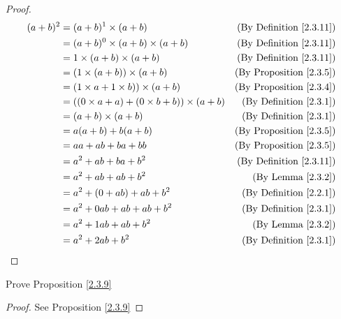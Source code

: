 \begin{proof}
\begin{align*}
    (a + b)^2 &= (a + b)^1 \times (a + b) & \text{(By Definition \ref{2.3.11})} \\
    &= (a + b)^0 \times (a + b) \times (a + b) & \text{(By Definition \ref{2.3.11})} \\
    &= 1 \times (a + b) \times (a + b) & \text{(By Definition \ref{2.3.11})} \\
    &= (1 \times (a + b)) \times (a + b) & \text{(By Proposition \ref{2.3.5})} \\
    &= (1 \times a + 1 \times b)) \times (a + b) & \text{(By Proposition \ref{2.3.4})} \\
    &= ((0 \times a + a) + (0 \times b + b)) \times (a + b) & \text{(By Definition \ref{2.3.1})} \\
    &= (a + b) \times (a + b) & \text{(By Definition \ref{2.3.1})} \\
    &= a(a + b) + b(a + b) & \text{(By Proposition \ref{2.3.5})} \\
    &= aa + ab + ba + bb & \text{(By Proposition \ref{2.3.5})} \\
    &= a^2 + ab + ba + b^2 & \text{(By Definition \ref{2.3.11})} \\
    &= a^2 + ab + ab + b^2 & \text{(By Lemma \ref{2.3.2})} \\
    &= a^2 + (0 + ab) + ab + b^2 & \text{(By Definition \ref{2.2.1})} \\
    &= a^2 + 0ab + ab + ab + b^2 & \text{(By Definition \ref{2.3.1})} \\
    &= a^2 + 1ab + ab + b^2 & \text{(By Lemma \ref{2.3.2})} \\
    &= a^2 + 2ab + b^2 & \text{(By Definition \ref{2.3.1})} \\
\end{align*}
\end{proof}

\begin{exercise}\label{ex 2.3.5}
Prove Proposition \ref{2.3.9}
\end{exercise}

\begin{proof}
See Proposition \ref{2.3.9}
\end{proof}